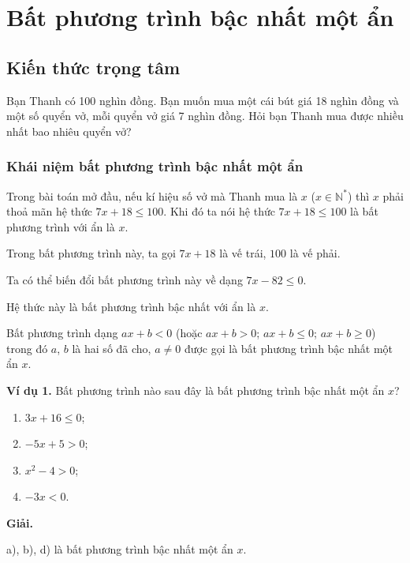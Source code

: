 \section{Bất phương trình bậc nhất một ẩn}

\begin{lesson}
    \subsection{Kiến thức trọng tâm}

    Bạn Thanh có 100 nghìn đồng. Bạn muốn mua một cái bút giá 18 nghìn đồng và một số quyển vở, mỗi quyển vở giá 7 nghìn đồng. Hỏi bạn Thanh mua được nhiều nhất bao nhiêu quyển vở?

    \subsubsection{Khái niệm bất phương trình bậc nhất một ẩn}

    Trong bài toán mở đầu, nếu kí hiệu số vở mà Thanh mua là $x$ ($x \in \mathbb{N}^*$) thì $x$ phải thoả mãn hệ thức $7x+18\leq 100$. Khi đó ta nói hệ thức $7x+18\leq 100$ là bất phương trình với ẩn là $x$.

    Trong bất phương trình này, ta gọi $7x+18$ là vế trái, $100$ là vế phải.

    Ta có thể biến đổi bất phương trình này về dạng $7x-82\leq 0$.

    Hệ thức này là bất phương trình bậc nhất với ẩn là $x$.

    \begin{keyconcept}
        Bất phương trình dạng $ax+b<0$ (hoặc $ax+b>0$; $ax+b\leq 0$; $ax+b\geq 0$) trong đó $a$, $b$ là hai số đã cho, $a\ne 0$ được gọi là bất phương trình bậc nhất một ẩn $x$.
    \end{keyconcept}

    \textbf{Ví dụ 1.} Bất phương trình nào sau đây là bất phương trình bậc nhất một ẩn $x$?

    \begin{enumerate}[label=\alph*)]
        \item $3x+16\leq 0$;
        \item $-5x+5>0$;
        \item $x^2-4>0$;
        \item $-3x<0$.
    \end{enumerate}

    \textbf{Giải.}

    a), b), d) là bất phương trình bậc nhất một ẩn $x$.


\end{lesson}
